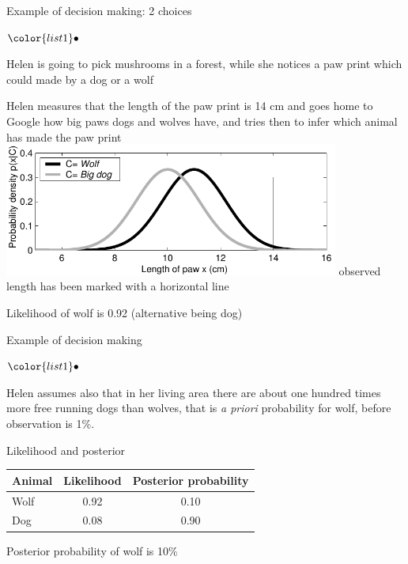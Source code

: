 \documentclass[t]{beamer}
\newenvironment{list1}{
   \begin{list}{$\color{list1}\bullet$}{\itemsep=6pt}}{
  \end{list}}
\begin{document}
\begin{frame}

{\Large\color{navyblue} Example of decision making: 2 choices}
\vspace{-0.5\baselineskip}
\begin{list1}
\item<+-> Helen is going to pick mushrooms in a forest, while she notices a
  paw print which could made by a dog or a wolf
\item<+-> Helen measures that the length of the paw print is 14 cm and
  goes home to Google how big paws dogs and wolves have, and tries
  then to infer which animal has made the paw print
  \includegraphics[width=11cm]{hatutus_likelihoods}
  observed length has been marked with a horizontal line
\item<+-> Likelihood of wolf is 0.92 (alternative being dog)
\end{list1}

\end{frame}

\begin{frame}
  
{\Large\color{navyblue} Example of decision making}

  \begin{list1}
  \item<+-> Helen assumes also that in her living area there are about one
    hundred times more free running dogs than wolves, that is {\em a
      priori} probability for wolf, before observation is 1\%.
  \item<+-> Likelihood and posterior
    \begin{center}\leavevmode
      \begin{tabular}{| l | c c |}
        \hline
        Animal &  Likelihood & Posterior probability \\
        \hline
        Wolf     &  0.92            & 0.10      \\
        Dog    &  0.08        & 0.90    \\
        \hline
      \end{tabular}
    \end{center}
  \item<+-> Posterior probability of wolf is 10\%
  \end{list1}

\end{frame}
\end{document}
